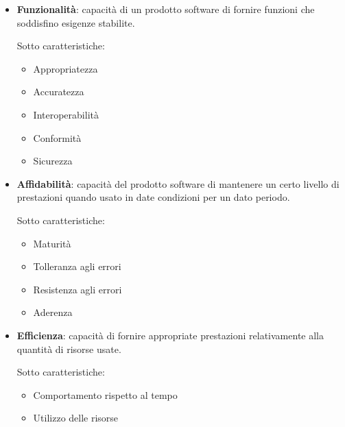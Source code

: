 		\begin{itemize}
		
			\item \textbf{Funzionalità}: capacità di un prodotto software di fornire funzioni che soddisfino esigenze stabilite.
			
			Sotto caratteristiche:
			
			\begin{itemize}
			
				\item Appropriatezza

				\item Accuratezza

				\item Interoperabilità

				\item Conformità

				\item Sicurezza

			\end{itemize}

		\item \textbf{Affidabilità}: capacità del prodotto software di mantenere un certo livello di prestazioni quando usato in date condizioni per un dato periodo.
		
			Sotto caratteristiche:
			
			\begin{itemize}
			
				\item Maturità

				\item Tolleranza agli errori

				\item Resistenza agli errori

				\item Aderenza

			\end{itemize}

		\item \textbf{Efficienza}: capacità di fornire appropriate prestazioni relativamente alla quantità di risorse usate.
		
			Sotto caratteristiche:
			
			\begin{itemize}
				\item Comportamento rispetto al tempo

				\item Utilizzo delle risorse


\end{itemize}
\end{itemize}
